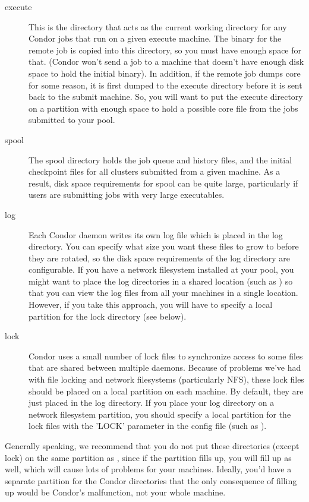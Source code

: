 \begin{description}
\item[execute] This is the directory that acts as the current working
directory for any Condor jobs that run on a given execute machine.
The binary for the remote job is copied into this directory, so you
must have enough space for that.  (Condor won't send a job to a
machine that doesn't have enough disk space to hold the initial
binary).  In addition, if the remote job dumps core for some reason,
it is first dumped to the execute directory before it is sent back to
the submit machine.  So, you will want to put the execute directory on
a partition with enough space to hold a possible core file from the
jobs submitted to your pool.

\item[spool] The spool directory holds the job queue and history files, and the
initial checkpoint files for all clusters submitted from a given
machine.  As a result, disk space requirements for spool can be quite
large, particularly if users are submitting jobs with very large
executables.

\item[log] Each Condor daemon writes its own log file which is placed in the log
directory.  You can specify what size you want these files to grow to
before they are rotated, so the disk space requirements of the log
directory are configurable.  If you have a network filesystem
installed at your pool, you might want to place the log directories in
a shared location (such as ) so that
you can view the log files from all your machines in a single
location.  However, if you take this approach, you will have to
specify a local partition for the lock directory (see below).

\item[lock] Condor uses a small number of lock files to synchronize access to some
files that are shared between multiple daemons.  Because of problems
we've had with file locking and network filesystems (particularly
NFS), these lock files should be placed on a local partition on each
machine.  By default, they are just placed in the log directory.  If
you place your log directory on a network filesystem partition, you
should specify a local partition for the lock files with the 'LOCK'
parameter in the config file (such as ).

\end{description}

Generally speaking, we recommend that you do not put these directories
(except lock) on the same partition as , since if the partition
fills up, you will fill up  as well, which will cause lots of
problems for your machines.  Ideally, you'd have a separate partition
for the Condor directories that the only consequence of filling up
would be Condor's malfunction, not your whole machine.

